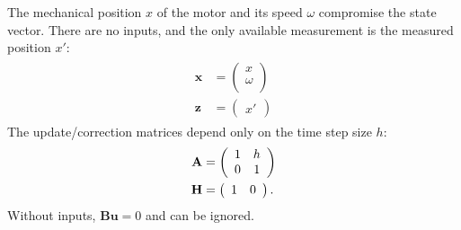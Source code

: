 \documentclass[12pt,a4paper,oneside,openany]{article}
\newcommand{\vx}{\ensuremath{\mathbf{x}}}
\newcommand{\vz}{\ensuremath{\mathbf{z}}}
\newcommand{\vu}{\ensuremath{\mathbf{u}}}
\newcommand{\mA}{\ensuremath{\mathbf{A}}}
\newcommand{\mB}{\ensuremath{\mathbf{B}}}
\newcommand{\mH}{\ensuremath{\mathbf{H}}}
\begin{document}
The mechanical position $x$ of the motor and its speed $\omega$ compromise the state vector. There are no inputs, and the only available measurement is the measured position $x'$:
\begin{gather}
\begin{aligned}
\vx &= \left(
\begin{array}{c}
      x  \\
 \omega \\
\end{array}
\right) \\
\vz &= \left(
\begin{array}{c}
      x'
\end{array}
\right)
\end{aligned}
\end{gather}
The update/correction matrices depend only on the time step size $h$:
\begin{gather}
\begin{aligned}
\mA &= \left(
\begin{array}{cc}
 1 & h \\
 0 & 1 \\
\end{array}
\right) \\
\mH &= \left(
\begin{array}{c c}
 1 & 0
\end{array}
\right).
\end{aligned}
\end{gather}
Without inputs, $\mB\vu = 0$ and can be ignored.
\end{document}
